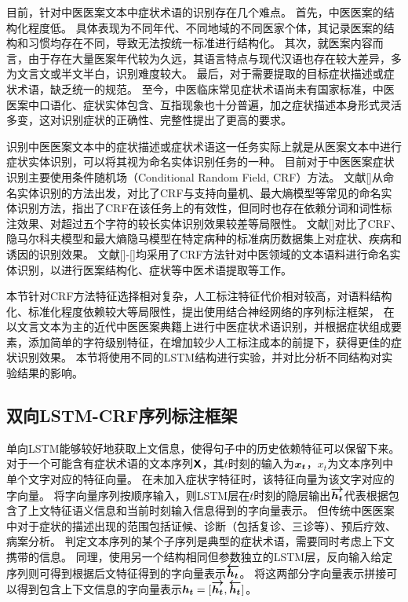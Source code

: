 目前，针对中医医案文本中症状术语的识别存在几个难点。
首先，中医医案的结构化程度低。
具体表现为不同年代、不同地域的不同医家个体，其记录医案的结构和习惯均存在不同，导致无法按统一标准进行结构化。
其次，就医案内容而言，由于存在大量医案年代较为久远，其语言特点与现代汉语也存在较大差异，多为文言文或半文半白，识别难度较大。
最后，对于需要提取的目标症状描述或症状术语，缺乏统一的规范。
至今，中医临床常见症状术语尚未有国家标准，中医医案中口语化、症状实体包含、互指现象也十分普遍，加之症状描述本身形式灵活多变，这对识别症状的正确性、完整性提出了更高的要求。

识别中医医案文本中的症状描述或症状术语这一任务实际上就是从医案文本中进行症状实体识别，可以将其视为命名实体识别任务的一种。
目前对于中医医案症状识别主要使用条件随机场（Conditional Random Field, CRF）方法。
文献[]从命名实体识别的方法出发，对比了CRF与支持向量机、最大熵模型等常见的命名实体识别方法，指出了CRF在该任务上的有效性，但同时也存在依赖分词和词性标注效果、对超过五个字符的较长实体识别效果较差等局限性。
文献[]对比了CRF、隐马尔科夫模型和最大熵隐马模型在特定病种的标准病历数据集上对症状、疾病和诱因的识别效果。
文献[]-[]均采用了CRF方法针对中医领域的文本语料进行命名实体识别，以进行医案结构化、症状等中医术语提取等工作。

本节针对CRF方法特征选择相对复杂，人工标注特征代价相对较高，对语料结构化、标准化程度依赖较大等局限性，提出使用结合神经网络的序列标注框架，
在以文言文本为主的近代中医医案典籍上进行中医症状术语识别，并根据症状组成要素，添加简单的字符级别特征，在增加较少人工标注成本的前提下，获得更佳的症状识别效果。
本节将使用不同的LSTM结构进行实验，并对比分析不同结构对实验结果的影响。

\subsection{双向LSTM-CRF序列标注框架}
单向LSTM能够较好地获取上文信息，使得句子中的历史依赖特征可以保留下来。
对于一个可能含有症状术语的文本序列$\boldsymbol{\mathsf{X}}$，其$t$时刻的输入为$\boldsymbol{x_t}$，$x_t$为文本序列中单个文字对应的特征向量。
在未加入症状字特征时，该特征向量为该文字对应的字向量。
将字向量序列按顺序输入，则LSTM层在$t$时刻的隐层输出$\boldsymbol{\overrightarrow{h_t}}$代表根据包含了上文特征语义信息和当前时刻输入信息得到的字向量表示。
但传统中医医案中对于症状的描述出现的范围包括证候、诊断（包括复诊、三诊等）、预后疗效、病案分析。
判定文本序列的某个子序列是典型的症状术语，需要同时考虑上下文携带的信息。
同理，使用另一个结构相同但参数独立的LSTM层，反向输入给定序列则可得到根据后文特征得到的字向量表示$\boldsymbol{\overleftarrow{h_t}}$。
将这两部分字向量表示拼接可以得到包含上下文信息的字向量表示$\boldsymbol{h_t} = [\boldsymbol{\overrightarrow{h_t}}, \boldsymbol{\overleftarrow{h_t}}]$。

